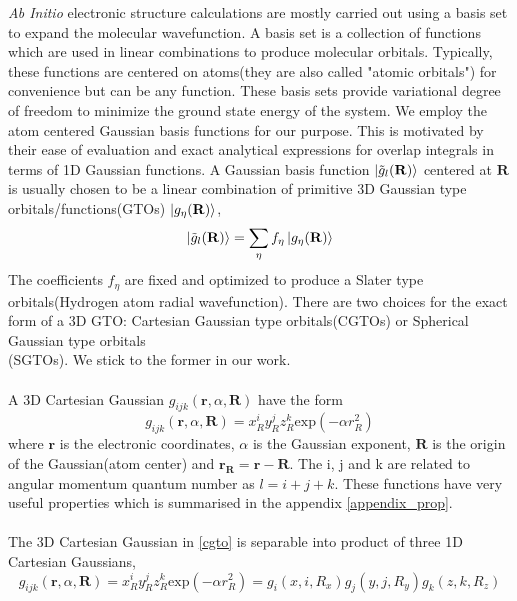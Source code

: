 \emph{Ab Initio} electronic structure calculations are mostly carried out using a basis set to expand the molecular wavefunction.\cite{basis_sets} A basis set is a collection of functions which are used in linear combinations to produce molecular orbitals. Typically, these functions are centered on atoms(they are also called "atomic orbitals") for convenience but can be any function. These basis sets provide variational degree of freedom to minimize the ground state energy of the system. We employ the atom centered Gaussian basis functions\cite{helgaker} for our purpose. This is motivated by their ease of evaluation and exact analytical expressions for overlap integrals in terms of 1D Gaussian functions. A Gaussian basis function $\ket{\tilde{g}_l(\mathbf{R})}$ centered at $\mathbf{R}$ is usually chosen to be a linear combination of primitive 3D Gaussian type orbitals/functions(GTOs) $\ket{g_\eta(\mathbf{R})}$,
\begin{equation}
    \ket{\tilde{g}_l(\mathbf{R})} = \sum_\eta f_\eta\ket{g_\eta(\mathbf{R})}
\end{equation}
The coefficients $f_\eta$ are fixed and optimized to produce a Slater type orbitals(Hydrogen atom radial wavefunction). There are two choices for the exact form of a 3D GTO: Cartesian Gaussian type orbitals(CGTOs) or Spherical Gaussian type orbitals\\(SGTOs). We stick to the former in our work. \\ \\
A 3D Cartesian Gaussian $g_{ijk}(\mathbf{r},\alpha,\mathbf{R})$ have the form\cite{helgaker}
\begin{equation}\label{cgto}
    g_{ijk}(\mathbf{r},\alpha,\mathbf{R}) = x^i_{R}y^j_{R}z^k_{R}\text{exp}(-\alpha r^2_R)
\end{equation}
where $\mathbf{r}$ is the electronic coordinates, $\alpha$ is the Gaussian exponent, $\mathbf{R}$ is the origin of the Gaussian(atom center) and $\mathbf{r_R} = \mathbf{r} - \mathbf{R}$. The i, j and k are related to angular momentum quantum number as $l = i+j+k$. These functions have very useful properties which is summarised in the appendix \ref{appendix_prop}. \\ \\
The 3D Cartesian Gaussian in \eqref{cgto} is separable into product of three 1D Cartesian Gaussians, 
\begin{equation}
    g_{ijk}(\mathbf{r},\alpha,\mathbf{R}) = x^i_{R}y^j_{R}z^k_{R}\text{exp}(-\alpha r^2_R) = g_i(x,i,R_x)g_j(y,j,R_y)g_k(z,k,R_z)
\end{equation}
